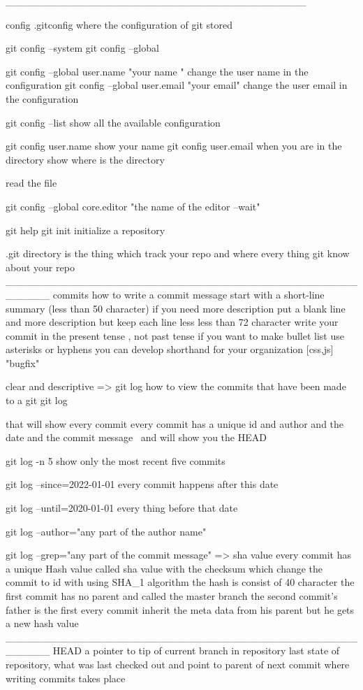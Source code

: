 _________________________________________

		config
.gitconfig    where the configuration of git stored 

git config --system 
git config --global  

git config --global user.name  "your name "    change the user name in the configuration
git config --global user.email  "your email"    change the user email  in the configuration

git config --list  show all the available configuration

git config user.name    show your name 
git config user.email
when you are in the directory 
show where is the directory 

read the file 

git config --global core.editor "the name of the editor --wait"

git help 
git init   initialize a repository


.git   directory  is the thing which track your repo  and where every thing git know about your repo 
______________________________________________________
                        commits
how to write a commit message
start  with a short-line summary (less than 50 character)
if you need more description 
put a blank line 
and more description 
but keep each line less less than 72 character 
write your commit in the present tense , not past tense 
if you want to make bullet list  use asterisks or hyphens
you can develop shorthand for your organization 
[css,js]
"bugfix"

clear and descriptive 
=>      git log 
how to view the commits that have been made to a git 
git log 

that will show every commit 
every commit has a unique id 
and author 
and the date 
and the commit message 
\
and will show you the HEAD

git log -n 5 
show only the most recent five commits 

git log --since=2022-01-01 
every commit happens after this date 

git log --until=2020-01-01 
every thing before that date 

git log --author="any part of the author name" 

git log --grep="any part of the commit message"
=>   sha value
every commit has a unique  Hash  value  called sha value  
with the checksum   which change the commit to id with using SHA_1 algorithm 
the hash   is consist of  40 character 
the first commit has no parent   and called the master branch 
the second commit's father is the first 
every commit inherit the meta data from his parent but he gets a new hash value
______________________________________________________
HEAD 
a pointer to tip of current branch in repository 
last state of repository, what was last checked out 
and point to parent of next commit where writing commits takes place 

